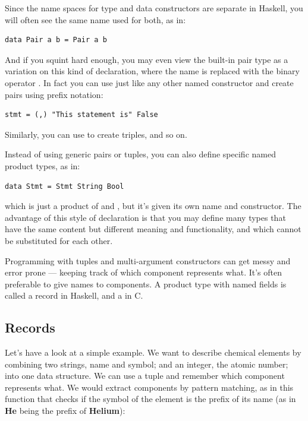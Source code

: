 Since the name spaces for type and data constructors are separate in
Haskell, you will often see the same name used for both, as in:

\begin{verbatim}
data Pair a b = Pair a b
\end{verbatim}

\noindent
And if you squint hard enough, you may even view the built-in pair type
as a variation on this kind of declaration, where the name 
is replaced with the binary operator \code{(,)}. In fact you can use
\code{(,)} just like any other named constructor and create pairs
using prefix notation:

\begin{verbatim}
stmt = (,) "This statement is" False
\end{verbatim}

\noindent
Similarly, you can use \code{(,,)} to create triples, and so on.

Instead of using generic pairs or tuples, you can also define specific
named product types, as in:

\begin{verbatim}
data Stmt = Stmt String Bool
\end{verbatim}

\noindent
which is just a product of  and , but it's
given its own name and constructor. The advantage of this style of
declaration is that you may define many types that have the same content
but different meaning and functionality, and which cannot be substituted
for each other.

Programming with tuples and multi-argument constructors can get messy
and error prone --- keeping track of which component represents what.
It's often preferable to give names to components. A product type with
named fields is called a record in Haskell, and a  in C.

\subsection{Records}\label{records}

Let's have a look at a simple example. We want to describe chemical
elements by combining two strings, name and symbol; and an integer, the
atomic number; into one data structure. We can use a tuple
 and remember which component represents
what. We would extract components by pattern matching, as in this
function that checks if the symbol of the element is the prefix of its
name (as in \textbf{He} being the prefix of \textbf{Helium}):

